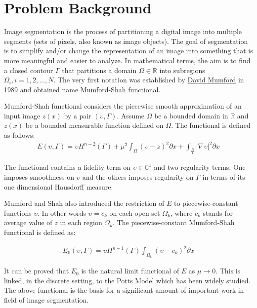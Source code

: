 \chapter{Problem Background}
\label{ch:problem_background}

Image segmentation \cite{Shapiro2001} is the process of partitioning a digital image into multiple segments (sets of pixels, also known as image objects). The goal of segmentation is to simplify and/or change the representation of an image into something that is more meaningful and easier to analyze. In mathematical terms, the aim is to find a closed contour $\Gamma$ that partitions a domain $\Omega \in \mathbb{R}$  into subregions $\Omega_i, i = 1, 2, ..., N$.
The very first notation was established by \href{https://en.wikipedia.org/wiki/David_Mumford}{\color{blue} David Mumford} in 1989 and obtained name \cite{Kim2020} Mumford-Shah functional.

Mumford-Shah functional considers the piecewise smooth approximation of an input image $z(x)$ by a pair $(\upsilon, \Gamma)$. Assume $\Omega$ be a bounded domain in $\mathbb{R}$ and $z(x)$ be a bounded measurable function defined on $\Omega$. The functional is defined as follows:
\begin{align*}
 E (\upsilon, \Gamma) = \upsilon H^{n-2} (\Gamma) + \mu^2 \int_{\Omega} (\upsilon - z)^2 \partial x + \int_{\frac{\Omega}{\Gamma}} \lvert \nabla \upsilon \rvert^2 \partial x
 \end{align*}

The functional contains a fidelity term on $\upsilon \in \complement^1$ and two regularity terms. One
imposes smoothness on $\upsilon$ and the others imposes regularity on $\Gamma$ in terms of its one dimensional \cite{Buda1992} Hausdorff measure.

Mumford and Shah also introduced the restriction of $E$ to piecewise-constant functions $\upsilon$. In other words $\upsilon = c_k$ on each open set $\Omega_k$, where $c_k$ stands for average value of $z$ in each region $\Omega_k$. The piecewise-constant Mumford-Shah functional is defined as:

\begin{align*}
 E_0 (\upsilon, \Gamma) = \upsilon H^{n-1} (\Gamma) \int_{\Omega_k} (\upsilon - c_k)^2 \partial x
\end{align*}

It can be proved that $E_0$ is the natural limit functional of $E$ as $\mu \to 0$. This is linked, in the discrete setting, to the \cite{Wu1982} Potts Model which has been widely studied. The above functional is the basis for a significant amount of important work in field of image segmentation.